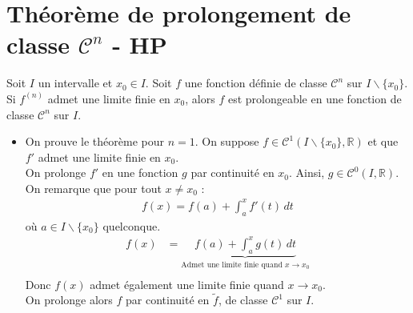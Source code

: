 \documentclass[../main.tex]{subfiles}
\begin{document}
\section{Théorème de prolongement de classe $\mathcal{C}^n$ - HP}
\begin{tcolorbox}[title=Théorème 18.43 - HP, title filled=false, colframe=orange, colback=orange!10!white]
    Soit $I$ un intervalle et $x_0 \in I$. Soit $f$ une fonction définie de classe $\mathcal{C}^n$ sur $I\backslash \{x_0\}$. Si $f^{(n)}$ admet une limite finie en $x_0$, alors $f$ est prolongeable en une fonction de classe $\mathcal{C}^n$ sur $I$.
\end{tcolorbox}

\begin{itemize}
    \item On prouve le théorème pour $n=1$. On suppose $f \in \mathcal{C}^1(I\backslash \{x_0\}, \mathbb{R})$ et que $f'$ admet une limite finie en $x_0$. \\
    On prolonge $f'$ en une fonction $g$ par continuité en $x_0$. Ainsi, $g \in \mathcal{C}^0(I, \mathbb{R})$. \\
    On remarque que pour tout $x \neq x_0$ : 
    \begin{align*}
        f(x) = f(a) + \int_a^x f'(t) \, dt
    \end{align*}
    où $a \in I\backslash \{x_0\}$ quelconque. 
    \begin{align*}
        f(x) &= \underbrace{f(a) + \int_a^x g(t) \, dt}_{\text{Admet une limite finie quand } x\to x_0} \\
    \end{align*}
    Donc $f(x)$ admet également une limite finie quand $x\to x_0$. \\
    On prolonge alors $f$ par continuité en $\tilde{f}$, de classe $\mathcal{C}^1$ sur $I$. \\


\end{itemize}
\end{document}

